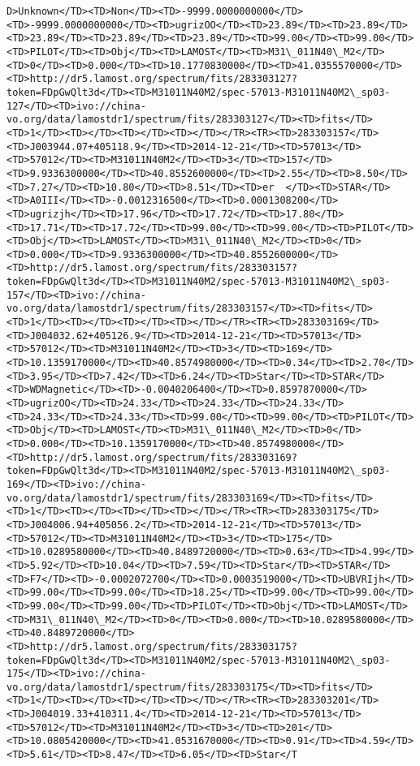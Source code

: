 \documentclass[11pt]{article}
\begin{document}
\begin{Verbatim}[commandchars=\\\{\}]
D>Unknown</TD><TD>Non</TD><TD>-9999.0000000000</TD><TD>-9999.0000000000</TD><TD>ugrizOO</TD><TD>23.89</TD><TD>23.89</TD><TD>23.89</TD><TD>23.89</TD><TD>23.89</TD><TD>99.00</TD><TD>99.00</TD><TD>PILOT</TD><TD>Obj</TD><TD>LAMOST</TD><TD>M31\_011N40\_M2</TD><TD>0</TD><TD>0.000</TD><TD>10.1770830000</TD><TD>41.0355570000</TD><TD>http://dr5.lamost.org/spectrum/fits/283303127?token=FDpGwQlt3d</TD><TD>M31011N40M2/spec-57013-M31011N40M2\_sp03-127</TD><TD>ivo://china-vo.org/data/lamostdr1/spectrum/fits/283303127</TD><TD>fits</TD><TD>1</TD><TD></TD><TD></TD><TD></TD></TR><TR><TD>283303157</TD><TD>J003944.07+405118.9</TD><TD>2014-12-21</TD><TD>57013</TD><TD>57012</TD><TD>M31011N40M2</TD><TD>3</TD><TD>157</TD><TD>9.9336300000</TD><TD>40.8552600000</TD><TD>2.55</TD><TD>8.50</TD><TD>7.27</TD><TD>10.80</TD><TD>8.51</TD><TD>er  </TD><TD>STAR</TD><TD>A0III</TD><TD>-0.0012316500</TD><TD>0.0001308200</TD><TD>ugrizjh</TD><TD>17.96</TD><TD>17.72</TD><TD>17.80</TD><TD>17.71</TD><TD>17.72</TD><TD>99.00</TD><TD>99.00</TD><TD>PILOT</TD><TD>Obj</TD><TD>LAMOST</TD><TD>M31\_011N40\_M2</TD><TD>0</TD><TD>0.000</TD><TD>9.9336300000</TD><TD>40.8552600000</TD><TD>http://dr5.lamost.org/spectrum/fits/283303157?token=FDpGwQlt3d</TD><TD>M31011N40M2/spec-57013-M31011N40M2\_sp03-157</TD><TD>ivo://china-vo.org/data/lamostdr1/spectrum/fits/283303157</TD><TD>fits</TD><TD>1</TD><TD></TD><TD></TD><TD></TD></TR><TR><TD>283303169</TD><TD>J004032.62+405126.9</TD><TD>2014-12-21</TD><TD>57013</TD><TD>57012</TD><TD>M31011N40M2</TD><TD>3</TD><TD>169</TD><TD>10.1359170000</TD><TD>40.8574980000</TD><TD>0.34</TD><TD>2.70</TD><TD>3.95</TD><TD>7.42</TD><TD>6.24</TD><TD>Star</TD><TD>STAR</TD><TD>WDMagnetic</TD><TD>-0.0040206400</TD><TD>0.8597870000</TD><TD>ugrizOO</TD><TD>24.33</TD><TD>24.33</TD><TD>24.33</TD><TD>24.33</TD><TD>24.33</TD><TD>99.00</TD><TD>99.00</TD><TD>PILOT</TD><TD>Obj</TD><TD>LAMOST</TD><TD>M31\_011N40\_M2</TD><TD>0</TD><TD>0.000</TD><TD>10.1359170000</TD><TD>40.8574980000</TD><TD>http://dr5.lamost.org/spectrum/fits/283303169?token=FDpGwQlt3d</TD><TD>M31011N40M2/spec-57013-M31011N40M2\_sp03-169</TD><TD>ivo://china-vo.org/data/lamostdr1/spectrum/fits/283303169</TD><TD>fits</TD><TD>1</TD><TD></TD><TD></TD><TD></TD></TR><TR><TD>283303175</TD><TD>J004006.94+405056.2</TD><TD>2014-12-21</TD><TD>57013</TD><TD>57012</TD><TD>M31011N40M2</TD><TD>3</TD><TD>175</TD><TD>10.0289580000</TD><TD>40.8489720000</TD><TD>0.63</TD><TD>4.99</TD><TD>5.92</TD><TD>10.04</TD><TD>7.59</TD><TD>Star</TD><TD>STAR</TD><TD>F7</TD><TD>-0.0002072700</TD><TD>0.0003519000</TD><TD>UBVRIjh</TD><TD>99.00</TD><TD>99.00</TD><TD>18.25</TD><TD>99.00</TD><TD>99.00</TD><TD>99.00</TD><TD>99.00</TD><TD>PILOT</TD><TD>Obj</TD><TD>LAMOST</TD><TD>M31\_011N40\_M2</TD><TD>0</TD><TD>0.000</TD><TD>10.0289580000</TD><TD>40.8489720000</TD><TD>http://dr5.lamost.org/spectrum/fits/283303175?token=FDpGwQlt3d</TD><TD>M31011N40M2/spec-57013-M31011N40M2\_sp03-175</TD><TD>ivo://china-vo.org/data/lamostdr1/spectrum/fits/283303175</TD><TD>fits</TD><TD>1</TD><TD></TD><TD></TD><TD></TD></TR><TR><TD>283303201</TD><TD>J004019.33+410311.4</TD><TD>2014-12-21</TD><TD>57013</TD><TD>57012</TD><TD>M31011N40M2</TD><TD>3</TD><TD>201</TD><TD>10.0805420000</TD><TD>41.0531670000</TD><TD>0.91</TD><TD>4.59</TD><TD>5.61</TD><TD>8.47</TD><TD>6.05</TD><TD>Star</T
\end{Verbatim}
\end{document}
